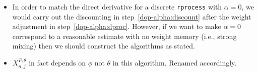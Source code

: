 \documentclass[12p]{article}
\newcommand\code[1]{\texttt{#1}}
\begin{document}
\begin{itemize}
\item In order to match the direct derivative for a discrete \code{rprocess} with $\alpha=0$, we would carry out the discounting in step~\ref{dop-alpha:discount} after the weight adjustment in step~\ref{dop-alpha:dproc}.
  However, if we want to make $\alpha=0$ correspond to a reasonable estimate with no weight memory (i.e., strong mixing) then we should construct the algorithms as stated.
\item ${X}_{n,j}^{P,\theta}$ in fact depends on $\phi$ not $\theta$ in this algorithm. Renamed accordingly.
\end{itemize}
\end{document}
